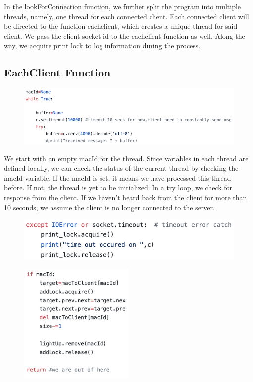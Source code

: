 \documentclass[a4paper,10pt]{article}
\begin{document}
In the lookForConnection function, we further split the program into multiple threads, namely, one thread for each connected client. Each connected client will be directed to the function each\textunderscore client, which creates a unique thread for said client. We pass the client socket id to the each\textunderscore client function as well. Along the way, we acquire print lock to log information during the process. 

\subsection{EachClient Function}

\begin{figure}[H]
  \centering
      \includegraphics[width=\textwidth]{Assets/timeout.png}
\end{figure}

We start with an empty macId for the thread. Since variables in each thread are defined locally, we can check the status of the current thread by checking the macId variable. If the macId is set, it means we have processed this thread before. If not, the thread is yet to be initialized. In a try loop, we check for response from the client. If we haven't heard back from the client for more than 10 seconds, we assume the client is no longer connected to the server.

\begin{figure}[H]
  \centering
      \includegraphics[width=\textwidth]{Assets/except.png}
\end{figure}

\begin{figure}[H]
  \centering
      \includegraphics[width=0.5\textwidth]{Assets/if_mac.png}
\end{figure}
\end{document}
